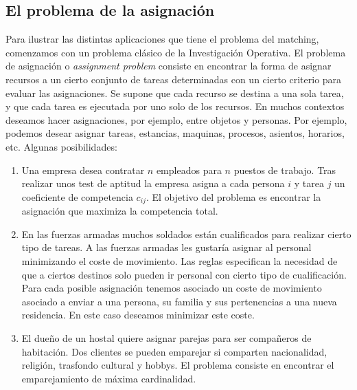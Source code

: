 \documentclass[twoside,a4paper,openright,12pt,tikz]{book}
\begin{document}
\subsection{El problema de la asignación}
Para ilustrar las distintas aplicaciones que tiene el problema del matching, comenzamos con un problema clásico de la Investigación Operativa. El problema de asignación o \textit{assignment problem} consiste en encontrar la forma de asignar recursos a un cierto conjunto de tareas determinadas con un cierto criterio para evaluar las asignaciones. Se supone que cada recurso se destina a una sola tarea, y que cada tarea es ejecutada por uno solo de los recursos. En muchos contextos deseamos hacer asignaciones, por ejemplo, entre objetos y personas. Por ejemplo, podemos desear asignar tareas, estancias, maquinas, procesos, asientos, horarios, etc. Algunas posibilidades:
\begin{enumerate}
\item Una empresa desea contratar $n$ empleados para $n$ puestos de trabajo. Tras realizar unos test de aptitud la empresa asigna a cada persona $i$ y tarea $j$ un coeficiente de competencia $c_{ij}$. El objetivo del problema es encontrar la asignación que maximiza la competencia total.
\item En las fuerzas armadas muchos soldados están cualificados para realizar cierto tipo de tareas. A las fuerzas armadas les gustaría asignar al personal minimizando el coste de movimiento. Las reglas especifican la necesidad de que a ciertos destinos solo pueden ir personal con cierto tipo de cualificación. Para cada posible asignación tenemos asociado un coste de movimiento asociado a enviar a una persona, su familia y sus pertenencias a una nueva residencia. En este caso deseamos minimizar este coste.
\item El dueño de un hostal quiere asignar parejas para ser compañeros de habitación. Dos clientes se pueden emparejar si comparten nacionalidad, religión, trasfondo cultural y hobbys. El problema consiste en encontrar el emparejamiento de máxima cardinalidad.
\end{enumerate}
\end{document}

